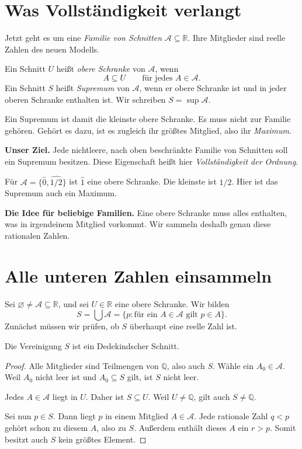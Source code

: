 \clearpage
\section{Was Vollständigkeit verlangt}
\label{cuts:supremum}

Jetzt geht es um eine \emph{Familie von Schnitten} $\mathcal A\subseteq\mathbb R$.
Ihre Mitglieder sind reelle Zahlen des neuen Modells.

\begin{definition}
Ein Schnitt $U$ heißt \emph{obere Schranke} von $\mathcal A$, wenn
\[
 A\subseteq U\qquad\text{für jedes }A\in\mathcal A.
\]
Ein Schnitt $S$ heißt \emph{Supremum} von $\mathcal A$, wenn er
obere Schranke ist und in jeder oberen Schranke enthalten ist.
Wir schreiben $S=\sup\mathcal A$.
\end{definition}
Ein Supremum ist damit die kleinste obere Schranke.
Es muss nicht zur Familie gehören. Gehört es dazu, ist es zugleich
ihr größtes Mitglied, also ihr \emph{Maximum}.

\textbf{Unser Ziel.}
Jede nichtleere, nach oben beschränkte Familie von Schnitten
soll ein Supremum besitzen. Diese Eigenschaft heißt hier
\emph{Vollständigkeit der Ordnung}.

\begin{beispiel}
Für $\mathcal A=\{\widehat0,\widehat{1/2}\}$ ist $\widehat1$
eine obere Schranke. Die kleinste ist $\widehat{1/2}$.
Hier ist das Supremum auch ein Maximum.
\end{beispiel}

\textbf{Die Idee für beliebige Familien.}
Eine obere Schranke muss alles enthalten, was in irgendeinem Mitglied
vorkommt. Wir sammeln deshalb genau diese rationalen Zahlen.

\clearpage
\section{Alle unteren Zahlen einsammeln}
\label{cuts:union-cut}

Sei $\varnothing\ne\mathcal A\subseteq\mathbb R$, und sei $U\in\mathbb R$
eine obere Schranke. Wir bilden
\[
 S=\bigcup\mathcal A
  =\{p:\text{für ein }A\in\mathcal A\text{ gilt }p\in A\}.
\]
Zunächst müssen wir prüfen, ob $S$ überhaupt eine reelle Zahl ist.

\begin{satz}
Die Vereinigung $S$ ist ein Dedekindscher Schnitt.
\end{satz}
\begin{proof}
Alle Mitglieder sind Teilmengen von $\mathbb Q$, also auch $S$.
Wähle ein $A_0\in\mathcal A$. Weil $A_0$ nicht leer ist und $A_0\subseteq S$ gilt,
ist $S$ nicht leer.

Jedes $A\in\mathcal A$ liegt in $U$. Daher ist $S\subseteq U$.
Weil $U\ne\mathbb Q$, gilt auch $S\ne\mathbb Q$.

Sei nun $p\in S$. Dann liegt $p$ in einem Mitglied $A\in\mathcal A$.
Jede rationale Zahl $q<p$ gehört schon zu diesem $A$, also zu $S$.
Außerdem enthält dieses $A$ ein $r>p$. Somit besitzt auch $S$
kein größtes Element.
\end{proof}

